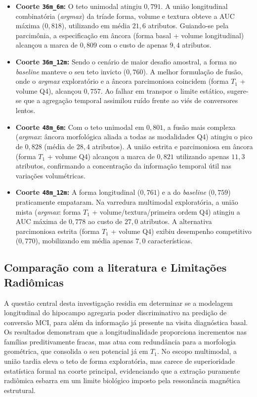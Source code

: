 \documentclass[review]{elsarticle}
\newcommand{\code}[1]{\texttt{#1}}
\begin{document}
	\begin{itemize}
		\item \textbf{Coorte \code{36m\_6m}:} O teto unimodal atingiu $0{,}791$. A união longitudinal combinatória (\emph{argmax}) da tríade forma, volume e textura obteve a AUC máxima ($0{,}818$), utilizando em média $21{,}6$ atributos. Guiando-se pela parcimônia, a especificação em âncora (forma basal + volume longitudinal) alcançou a marca de $0{,}809$ com o custo de apenas $9{,}4$ atributos.
		
		\item \textbf{Coorte \code{36m\_12m}:} Sendo o cenário de maior desafio amostral, a forma no \textit{baseline} manteve o seu teto invicto ($0{,}760$). A melhor formulação de fusão, onde o \emph{argmax} exploratório e a âncora parcimoniosa coincidem (forma $T_1$ + volume Q4), alcançou $0{,}757$. Ao falhar em transpor o limite estático, sugere-se que a agregação temporal assimilou ruído frente ao viés de conversores lentos.
		
		\item \textbf{Coorte \code{48m\_6m}:} Com o teto unimodal em $0{,}801$, a fusão mais complexa (\emph{argmax}: âncora morfológica aliada a todas as modalidades Q4) atingiu o pico de $0{,}828$ (média de $28{,}4$ atributos). A união estrita e parcimoniosa em âncora (forma $T_1$ + volume Q4) alcançou a marca de $0{,}821$ utilizando apenas $11{,}3$ atributos, confirmando a concentração da informação temporal útil nas variações volumétricas.
		
		\item \textbf{Coorte \code{48m\_12m}:} A forma longitudinal ($0{,}761$) e a do \textit{baseline} ($0{,}759$) praticamente empataram. Na varredura multimodal exploratória, a união mista (\emph{argmax}: forma $T_1$ + volume/textura/primeira ordem Q4) atingiu a AUC máxima de $0{,}778$ ao custo de $27{,}0$ atributos. A alternativa parcimoniosa estrita (forma $T_1$ + volume Q4) exibiu desempenho competitivo ($0{,}770$), mobilizando em média apenas $7{,}0$ características.
	\end{itemize}
	
	\subsection{Comparação com a literatura e Limitações Radiômicas}
	
	A questão central desta investigação residia em determinar se a modelagem longitudinal do hipocampo agregaria poder discriminativo na predição de conversão MCI, para além da informação já presente na visita diagnóstica basal. Os resultados demonstram que a longitudinalidade proporciona incrementos nas famílias preditivamente fracas, mas atua com redundância para a morfologia geométrica, que consolida o seu potencial já em $T_1$. No escopo multimodal, a união tardia eleva o teto de forma exploratória, mas carece de superioridade estatística formal na coorte principal, evidenciando que a extração puramente radiômica esbarra em um limite biológico imposto pela ressonância magnética estrutural.
	
\end{document}
